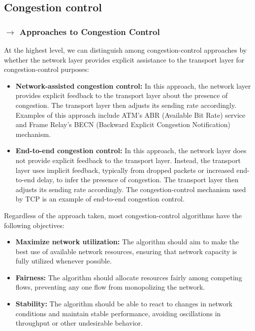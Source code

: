 \clearpage
\subsection[3.6 Congestion control]{\hspace*{0.075 em}\raisebox{0.2 em}{$\pmb{\drsh}$} Congestion control}
\label{subsec:congestion-control}

\subsubsection[3.6.1 Approaches to Congestion Control]{$\pmb{\rightarrow}$ Approaches to Congestion Control}

At the highest level, we can distinguish among congestion-control approaches by whether the network layer provides explicit assistance to the transport layer for congestion-control purposes:

\begin{itemize}
    \item \textbf{Network-assisted congestion control:} In this approach, the network layer provides explicit feedback to the transport layer about the presence of congestion. The transport layer then adjusts its sending rate accordingly. Examples of this approach include ATM's ABR (Available Bit Rate) service and Frame Relay's BECN (Backward Explicit Congestion Notification) mechanism.
    
    \item \textbf{End-to-end congestion control:} In this approach, the network layer does not provide explicit feedback to the transport layer. Instead, the transport layer uses implicit feedback, typically from dropped packets or increased end-to-end delay, to infer the presence of congestion. The transport layer then adjusts its sending rate accordingly. The congestion-control mechanism used by TCP is an example of end-to-end congestion control.
\end{itemize}

\noindent Regardless of the approach taken, most congestion-control algorithms have the following objectives:

\begin{itemize}
    \item \textbf{Maximize network utilization:} The algorithm should aim to make the best use of available network resources, ensuring that network capacity is fully utilized whenever possible.
    
    \item \textbf{Fairness:} The algorithm should allocate resources fairly among competing flows, preventing any one flow from monopolizing the network.
    
    \item \textbf{Stability:} The algorithm should be able to react to changes in network conditions and maintain stable performance, avoiding oscillations in throughput or other undesirable behavior.
\end{itemize}

